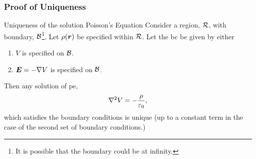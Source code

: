     \subsubsection{Proof of Uniqueness}
    \begin{theorem}{Uniqueness of the solution Poisson's Equation}{}
        Consider a region, \(\mathcal{R}\), with boundary, \(\mathcal{B}\)\footnote{It is possible that the boundary could be at infinity.}.
        Let \(\rho(\bm{r})\) be specified within \(\mathcal{R}\).
        Let the \acrshort{bc} be given by either
        \begin{enumerate}
            \item \(V\) is specified on \(\mathcal{B}\).
            \item \(\bm{E} = -\nabla V\) is specified on \(\mathcal{B}\).
        \end{enumerate}
        Then any solution of \acrfull{pe},
        \[\nabla^2 V = -\frac{\rho}{\varepsilon_0},\]
        which satisfies the boundary conditions is unique (up to a constant term in the case of the second set of boundary conditions.)
    \end{theorem}

